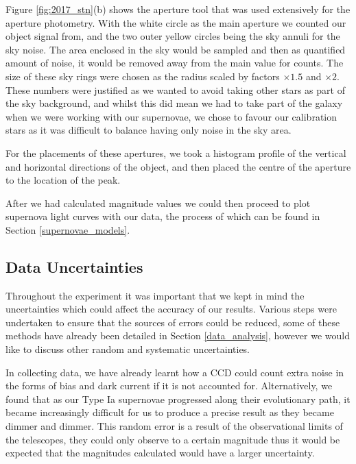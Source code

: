 \documentclass[twocolumn]{revtex4}
\begin{document}
Figure \ref{fig:2017_stn}(b) shows the aperture tool that was used extensively for the aperture photometry. With the white circle as the main aperture we counted our object signal from, and the two outer yellow circles being the sky annuli for the sky noise. The area enclosed in the sky would be sampled and then as quantified amount of noise, it would be removed away from the main value for counts. The size of these sky rings were chosen as the radius scaled by factors $\times 1.5$ and $\times 2$. These numbers were justified as we wanted to avoid taking other stars as part of the sky background, and whilst this did mean we had to take part of the galaxy when we were working with our supernovae, we chose to favour our calibration stars as it was difficult to balance having only noise in the sky area.

For the placements of these apertures, we took a histogram profile of the vertical and horizontal directions of the object, and then placed the centre of the aperture to the location of the peak. 

After we had calculated magnitude values we could then proceed to plot supernova light curves with our data, the process of which can be found in Section \ref{supernovae_models}.

\vspace{-3ex}
\subsection{Data Uncertainties}
\vspace{-2ex}
Throughout the experiment it was important that we kept in mind the uncertainties which could affect the accuracy of our results. Various steps were undertaken to ensure that the sources of errors could be reduced, some of these methods have already been detailed in Section \ref{data_analysis}, however we would like to discuss other random and systematic uncertainties.

In collecting data, we have already learnt how a CCD could count extra noise in the forms of bias and dark current if it is not accounted for. Alternatively, we found that as our Type Ia supernovae progressed along their evolutionary path, it became increasingly difficult for us to produce a precise result as they became dimmer and dimmer. This random error is a result of the observational limits of the telescopes, they could only observe to a certain magnitude thus it would be expected that the magnitudes calculated would have a larger uncertainty.
\end{document}
